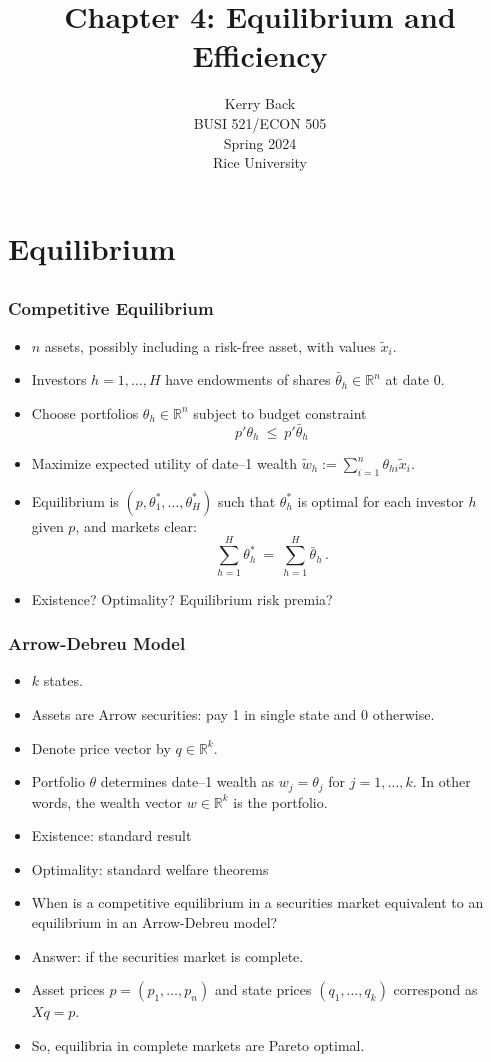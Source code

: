 \documentclass[10pt]{beamer}
\title{Chapter 4: Equilibrium and Efficiency}
\date{}
\author{Kerry Back\\ 
BUSI 521/ECON 505\\
Spring 2024\\
Rice University}
\newcommand{\bi}{\begin{itemize}}
\newcommand{\ei}{\end{itemize}}
\newcommand{\im}{\item}
\newcommand{\myreal}{\ensuremath{\mathbb{R}}}
\newcommand{\bfr}{\begin{frame}}
\newcommand{\tw}{\tilde{w}}
\newcommand{\tx}{\tilde{x}}
\begin{document}

\begin{frame}[plain]
    \titlepage
  \end{frame}
  
  
  \section{Equilibrium}\subsection{}
  \bfr\frametitle{Competitive Equilibrium}
  \bi 
  \im $n$ assets, possibly including a risk-free asset, with values $\tx_i$.  
  \im Investors $h=1, \ldots, H$ have endowments of shares $\bar{\theta}_h \in \myreal^n$ at date 0.
  \im Choose portfolios $\theta_h \in \myreal^n$ subject to budget constraint
  $$p'\theta_h \ \le \ p'\bar{\theta}_h$$
  \im Maximize expected utility of date--1 wealth $\tw_h :=\sum_{i=1}^n \theta_{hi}\tx_i$.   
  \im Equilibrium is $(p,\theta^*_1, \ldots, \theta^*_H)$ such that $\theta^*_h$ is optimal for each investor $h$ given $p$, and markets clear:
  $$\sum_{h=1}^H \theta^*_h \ = \ \sum_{h=1}^H \bar{\theta}_h\,.$$
  \im  Existence?
  Optimality?  
  Equilibrium risk premia?
  \ei
  \end{frame}
  
  \bfr\frametitle{Arrow-Debreu Model}
  \bi 
  \im 
  $k$ states.  
  \im Assets are Arrow securities: pay 1 in single state and 0 otherwise.  
  \im Denote price vector by $q \in \myreal^k$.     
  \im Portfolio $\theta$ determines date--1 wealth as $w_j = \theta_j$ for $j=1, \ldots, k$.  In other words, the wealth vector $w \in \myreal^k$ is the portfolio.
  \im Existence: standard result
  \im Optimality: standard welfare theorems
  \ei 
  \end{frame}
  
  \begin{frame}
    \bi 
    \im 
  When is a competitive equilibrium in a securities market equivalent to an equilibrium in an Arrow-Debreu model?
  \im   Answer: if the securities market is complete.
  \im Asset prices $p =(p_1, \ldots, p_n)$ and state prices $(q_1, \ldots, q_k)$ correspond as $Xq=p$.
  \im  So, equilibria in complete markets are Pareto optimal.
  \ei
  \end{frame}
  
\end{document}
